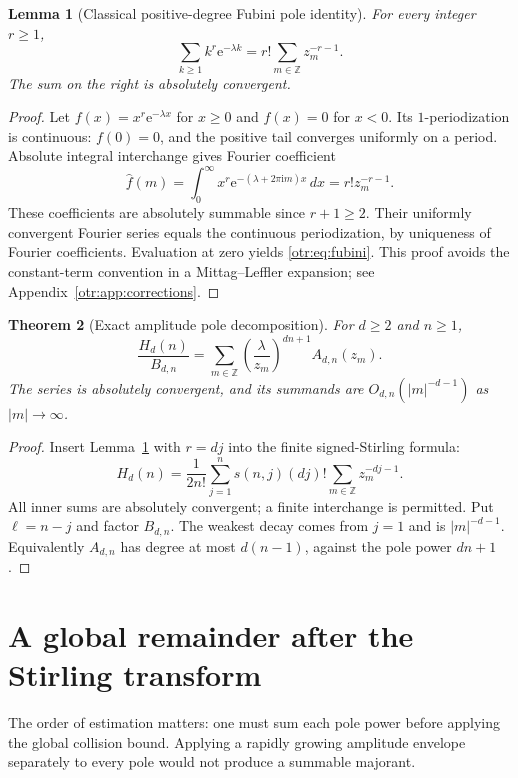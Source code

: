\documentclass[11pt,a4paper]{article}
\newtheorem{theorem}{Theorem}[section]
\newtheorem{lemma}[theorem]{Lemma}
\theoremstyle{definition}\newtheorem{definition}[theorem]{Definition}
\theoremstyle{remark}\newtheorem{remark}[theorem]{Remark}
\newcommand{\lam}{\lambda}
\newcommand{\e}{\mathrm e}
\newcommand{\ii}{\mathrm i}
\newcommand{\Z}{\mathbb Z}
\begin{document}
\begin{lemma}[Classical positive-degree Fubini pole identity]\label{otr:lem:fubini}
For every integer $r\ge1$,
\begin{equation}\label{otr:eq:fubini}
 \sum_{k\ge1}k^r\e^{-\lam k}=r!\sum_{m\in\Z}z_m^{-r-1}.
\end{equation}
The sum on the right is absolutely convergent.
\end{lemma}
\begin{proof}
Let $f(x)=x^r\e^{-\lam x}$ for $x\ge0$ and $f(x)=0$ for $x<0$. Its $1$-periodization is continuous: $f(0)=0$, and the positive tail converges uniformly on a period. Absolute integral interchange gives Fourier coefficient
\[
 \widehat f(m)=\int_0^\infty x^r\e^{-(\lam+2\pi\ii m)x}\,dx
 =r!z_m^{-r-1}.
\]
These coefficients are absolutely summable since $r+1\ge2$. Their uniformly convergent Fourier series equals the continuous periodization, by uniqueness of Fourier coefficients. Evaluation at zero yields \eqref{otr:eq:fubini}. This proof avoids the constant-term convention in a Mittag--Leffler expansion; see Appendix~\ref{otr:app:corrections}.
\end{proof}

\begin{theorem}[Exact amplitude pole decomposition]\label{otr:thm:exact}
For $d\ge2$ and $n\ge1$,
\begin{equation}\label{otr:eq:exactpoles}
 \frac{H_d(n)}{B_{d,n}}
 =\sum_{m\in\Z}\left(\frac{\lam}{z_m}\right)^{dn+1}A_{d,n}(z_m).
\end{equation}
The series is absolutely convergent, and its summands are
$O_{d,n}(|m|^{-d-1})$ as $|m|\to\infty$.
\end{theorem}
\begin{proof}
Insert Lemma~\ref{otr:lem:fubini} with $r=dj$ into the finite signed-Stirling formula:
\begin{equation}\label{otr:eq:rawpoles}
 H_d(n)=\frac1{2n!}\sum_{j=1}^{n}s(n,j)(dj)!
                         \sum_{m\in\Z}z_m^{-dj-1}.
\end{equation}
All inner sums are absolutely convergent; a finite interchange is permitted. Put $\ell=n-j$ and factor $B_{d,n}$. The weakest decay comes from $j=1$ and is $|m|^{-d-1}$. Equivalently $A_{d,n}$ has degree at most $d(n-1)$, against the pole power $dn+1$.
\end{proof}

\section{A global remainder after the Stirling transform}
\label{otr:sec:tail}
The order of estimation matters: one must sum each pole power before applying the global collision bound. Applying a rapidly growing amplitude envelope separately to every pole would not produce a summable majorant.
\end{document}
